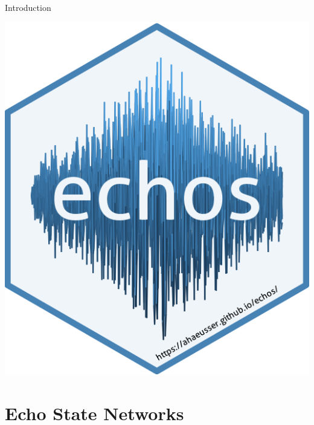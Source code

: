 \documentclass[aspectratio=169]{beamer}
\begin{document}
\begin{frame}[t]{Introduction}
\begin{minipage}[t]{0.5\textwidth}
\begin{itemize}
\begin{center}
        	\includegraphics[scale=0.5]{figures/echos.png} 
        	\end{center}
        \end{itemize}
    \end{minipage}
\end{frame}



\section{Echo State Networks}
\end{document}
